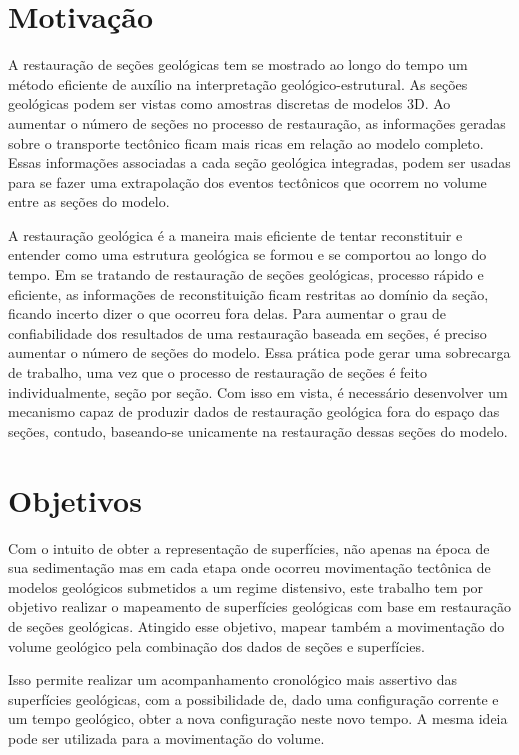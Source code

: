 \section{Motivação}

A restauração de seções geológicas tem se mostrado ao longo do tempo um método eficiente de auxílio na interpretação geológico-estrutural. As seções geológicas podem ser vistas como amostras discretas de modelos 3D. Ao aumentar o número de seções no processo de restauração, as informações geradas sobre o transporte tectônico ficam mais ricas em relação ao modelo completo. Essas informações associadas a cada seção geológica integradas, podem ser usadas para se fazer uma extrapolação dos eventos tectônicos que ocorrem no volume entre as seções do modelo.

A restauração geológica é a maneira mais eficiente de tentar reconstituir e entender como uma estrutura geológica se formou e se comportou ao longo do tempo. Em se tratando de restauração de seções geológicas, processo rápido e eficiente, as informações de reconstituição ficam restritas ao domínio da seção, ficando incerto dizer o que ocorreu fora delas. Para aumentar o grau de confiabilidade dos resultados de uma restauração baseada em seções, é preciso aumentar o número de seções do modelo. Essa prática pode gerar uma sobrecarga de trabalho, uma vez que o processo de restauração de seções é feito individualmente, seção por seção. Com isso em vista, é necessário desenvolver um mecanismo capaz de produzir dados de restauração geológica fora do espaço das seções, contudo, baseando-se unicamente na restauração dessas seções do modelo.

\section{Objetivos}

Com o intuito de obter a representação de superfícies, não apenas na época de sua sedimentação mas em cada etapa onde ocorreu movimentação tectônica de modelos geológicos submetidos a um regime distensivo, este trabalho tem por objetivo realizar o mapeamento de superfícies geológicas com base em restauração de seções geológicas. Atingido esse objetivo, mapear também a movimentação do volume geológico pela combinação dos dados de seções e superfícies.

Isso permite realizar um acompanhamento cronológico mais assertivo das superfícies geológicas, com a possibilidade de, dado uma configuração corrente e um tempo geológico, obter a nova configuração neste novo tempo. A mesma ideia pode ser utilizada para a movimentação do volume.

